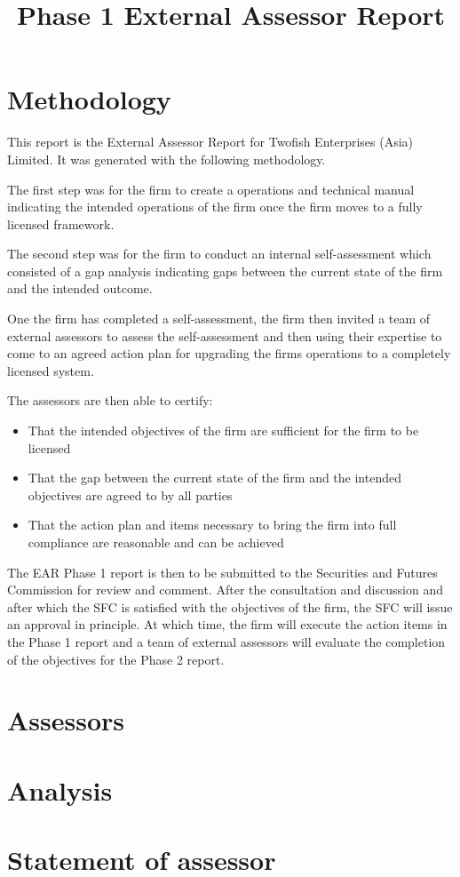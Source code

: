 \documentclass[]{report}
\title{Phase 1 External Assessor Report}
\author{\firmfullname}
\def\firmfullname{Twofish Enterprises (Asia) Limited}
\begin{document}
\maketitle
\section{Methodology}

This report is the External Assessor Report for \firmfullname.  It was
generated with the following methodology.

The first step was for the firm to create a operations and technical
manual indicating the intended operations of the firm once the firm
moves to a fully licensed framework.

The second step was for the firm to conduct an internal
self-assessment which consisted of a gap analysis indicating gaps
between the current state of the firm and the intended outcome.

One the firm has completed a self-assessment, the firm then invited a
team of external assessors to assess the self-assessment and then
using their expertise to come to an agreed action plan for upgrading
the firms operations to a completely licensed system.

The assessors are then able to certify:

\begin{itemize}
  \item That the intended objectives of the firm are sufficient for
    the firm to be licensed
  \item That the gap between the current state of the firm and the
    intended objectives are agreed to by all parties
  \item That the action plan and items necessary to bring the firm
    into full compliance are reasonable and can be achieved
\end{itemize}

The EAR Phase 1 report is then to be submitted to the Securities and
Futures Commission for review and comment.  After the consultation and
discussion and after which the SFC is satisfied with the objectives of
the firm, the SFC will issue an approval in principle.  At which time,
the firm will execute the action items in the Phase 1 report and a
team of external assessors will evaluate the completion of the
objectives for the Phase 2 report.

\section{Assessors}


\section{Analysis}

\section{Statement of assessor}

\end{document}
